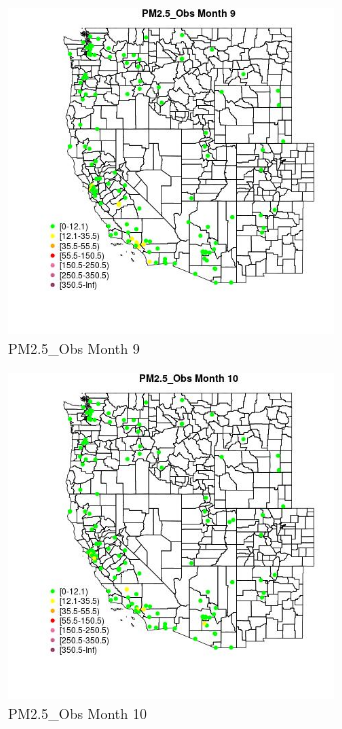 \begin{figure} 
\centering  
\includegraphics[width=0.77\textwidth]{Code_Outputs/Report_ML_input_PM25_Step4_part_e_de_duplicated_aves_MapObsMo9PM25_Obs.jpg} 
\caption{\label{fig:Report_ML_input_PM25_Step4_part_e_de_duplicated_avesMapObsMo9PM25_Obs}PM2.5_Obs Month 9} 
\end{figure} 
 

\clearpage 

\begin{figure} 
\centering  
\includegraphics[width=0.77\textwidth]{Code_Outputs/Report_ML_input_PM25_Step4_part_e_de_duplicated_aves_MapObsMo10PM25_Obs.jpg} 
\caption{\label{fig:Report_ML_input_PM25_Step4_part_e_de_duplicated_avesMapObsMo10PM25_Obs}PM2.5_Obs Month 10} 
\end{figure} 
 


